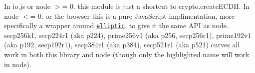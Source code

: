 In io.\+js or node $>$= 0. this module is just a shortcut to crypto.\+create\+E\+C\+DH. In node $<$= 0. or the browser this is a pure Java\+Script implimentation, more specifically a wrapper around \href{https://github.com/indutny/elliptic}{\tt elliptic}, to give it the same A\+PI as node. {\ttfamily secp256k1}, {\ttfamily secp224r1} (aka p224), {\ttfamily prime256v1} (aka p256, secp256r1), {\ttfamily prime192v1} (aka p192, secp192r1), {\ttfamily secp384r1} (aka p384), {\ttfamily secp521r1} (aka p521) curves all work in both this library and node (though only the highlighted name will work in node). 